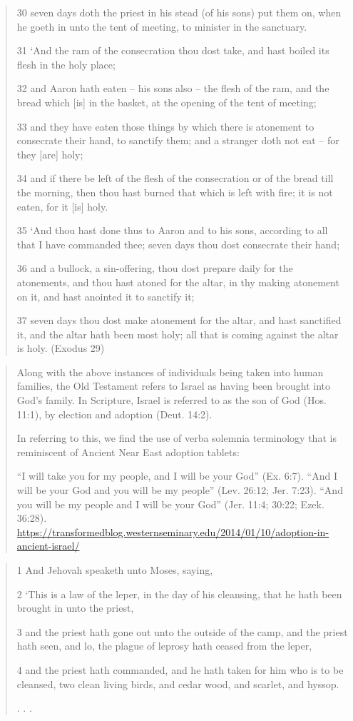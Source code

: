 \documentclass[11pt]{article}
\begin{document}
\begin{quote}
30 seven days doth the priest in his stead (of his sons) put them on, when he goeth in unto the tent of meeting, to minister in the sanctuary.

31 `And the ram of the consecration thou dost take, and hast boiled its flesh in the holy place;

32 and Aaron hath eaten -- his sons also -- the flesh of the ram, and the bread which [is] in the basket, at the opening of the tent of meeting;

33 and they have eaten those things by which there is atonement to consecrate their hand, to sanctify them; and a stranger doth not eat -- for they [are] holy;

34 and if there be left of the flesh of the consecration or of the bread till the morning, then thou hast burned that which is left with fire; it is not eaten, for it [is] holy.

35 `And thou hast done thus to Aaron and to his sons, according to all that I have commanded thee; seven days thou dost consecrate their hand;

36 and a bullock, a sin-offering, thou dost prepare daily for the atonements, and thou hast atoned for the altar, in thy making atonement on it, and hast anointed it to sanctify it;

37 seven days thou dost make atonement for the altar, and hast sanctified it, and the altar hath been most holy; all that is coming against the altar is holy.
(Exodus 29)
\end{quote}

\begin{quote}
Along with the above instances of individuals being taken into human families, the Old Testament refers to Israel as having been brought into God’s family. In Scripture, Israel is referred to as the son of God (Hos. 11:1), by election and adoption (Deut. 14:2).

In referring to this, we find the use of verba solemnia terminology that is reminiscent of Ancient Near East adoption tablets:

“I will take you for my people, and I will be your God” (Ex. 6:7).
“And I will be your God and you will be my people” (Lev. 26:12; Jer. 7:23).
“And you will be my people and I will be your God” (Jer. 11:4; 30:22; Ezek. 36:28).
\url{https://transformedblog.westernseminary.edu/2014/01/10/adoption-in-ancient-israel/}
\end{quote}

\begin{quote}
1 And Jehovah speaketh unto Moses, saying,

2 `This is a law of the leper, in the day of his cleansing, that he hath been brought in unto the priest,

3 and the priest hath gone out unto the outside of the camp, and the priest hath seen, and lo, the plague of leprosy hath ceased from the leper,

4 and the priest hath commanded, and he hath taken for him who is to be cleansed, two clean living birds, and cedar wood, and scarlet, and hyssop.

. . . 

\end{quote}
\end{document}
